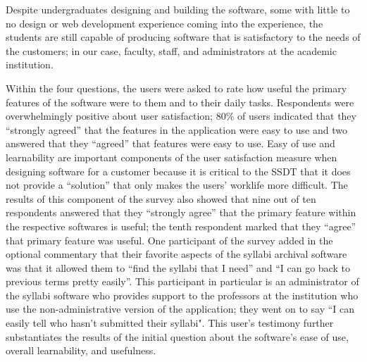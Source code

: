 Despite undergraduates designing and building the software, some with little to no design or web development experience coming into the experience, the students are still capable of producing software that is satisfactory to the needs of the customers; in our case, faculty, staff, and administrators at the academic institution. %


Within the four questions, the users were asked to rate how useful the primary features of the software were to them and to their daily tasks. Respondents were overwhelmingly positive about user satisfaction; 80\% of users indicated that they ``strongly agreed'' that the features in the application were easy to use and two answered that they ``agreed'' that features were easy to use. Easy of use and learnability are important components of the user satisfaction measure when designing software for a customer because it is critical to the SSDT that it does not provide a ``solution'' that only makes the users' worklife more difficult. The results of this component of the survey also showed that nine out of ten respondents answered that they ``strongly agree'' that the primary feature within the respective softwares is useful; the tenth respondent marked that they ``agree'' that  primary feature was useful. One participant of the survey added in the optional commentary that their favorite aspects of the syllabi archival software was that it allowed them to  ``find the syllabi that I need'' and ``I can go back to previous terms pretty easily''. This participant in particular is an administrator of the syllabi software who provides support to the professors at the institution who use the non-administrative version of the application; they went on to say ``I can easily tell who hasn't submitted their syllabi". This user's testimony further substantiates the results of the initial question about the software's ease of use, overall learnability, and usefulness.


